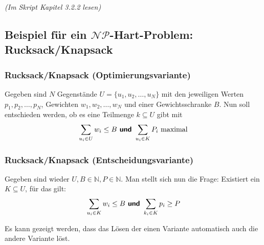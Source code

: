 \documentclass{scrartcl}%
\begin{document}
    \textit{(Im Skript Kapitel 3.2.2 lesen)}

    \subsection*{Beispiel für ein $\mathcal{N}\mathcal{P}$-Hart-Problem: Rucksack/Knapsack}
    \subsubsection*{Rucksack/Knapsack (Optimierungsvariante)}
    Gegeben sind $N$ Gegenstände $U=\{u_1,u_2,\dots,u_N\}$ mit den jeweiligen
    Werten $p_1,p_2,\dots,p_N$,
    Gewichten $w_1,w_2,\dots,w_N$ und einer
    Gewichtsschranke $B$. Nun soll entschieden werden, ob es eine Teilmenge $k \subseteq U$ gibt mit
    \begin{equation*}
        \sum_{u_i \in U} w_i \leq B \text{\textbf{\textsf{ und }}} \sum_{u_i \in K} P_i \text{ maximal}
    \end{equation*}

    \subsubsection*{Rucksack/Knapsack (Entscheidungsvariante)}
    Gegeben sind wieder $U, B \in \mathbb{N}, P \in \mathbb{N}$. Man stellt sich nun die Frage: Existiert ein $K \subseteq U$, für das gilt:
    \begin{equation*}
        \sum_{u_i \in K} w_i \leq B \text{\textbf{\textsf{ und }}} \sum_{k_i \in K} p_i \geq P
    \end{equation*}

    \vspace*{0.3cm}
    Es kann gezeigt werden, dass das Lösen der einen Variante automatisch auch die andere Variante löst.
\end{document}
